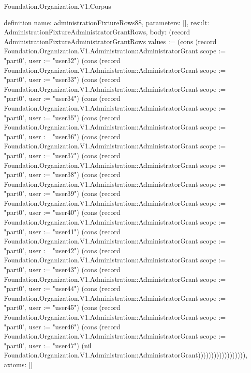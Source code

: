 \begin{lexlean}{Foundation.Organization.V1.Corpus}
\begin{semanticmodule}
definition{
  name: administrationFixtureRows88,
  parameters: [],
  result: AdministrationFixtureAdministratorGrantRows,
  body: (record AdministrationFixtureAdministratorGrantRows {values := (cons (record Foundation.Organization.V1.Administration::AdministratorGrant {scope := "part0", user := "user32"}) (cons (record Foundation.Organization.V1.Administration::AdministratorGrant {scope := "part0", user := "user33"}) (cons (record Foundation.Organization.V1.Administration::AdministratorGrant {scope := "part0", user := "user34"}) (cons (record Foundation.Organization.V1.Administration::AdministratorGrant {scope := "part0", user := "user35"}) (cons (record Foundation.Organization.V1.Administration::AdministratorGrant {scope := "part0", user := "user36"}) (cons (record Foundation.Organization.V1.Administration::AdministratorGrant {scope := "part0", user := "user37"}) (cons (record Foundation.Organization.V1.Administration::AdministratorGrant {scope := "part0", user := "user38"}) (cons (record Foundation.Organization.V1.Administration::AdministratorGrant {scope := "part0", user := "user39"}) (cons (record Foundation.Organization.V1.Administration::AdministratorGrant {scope := "part0", user := "user40"}) (cons (record Foundation.Organization.V1.Administration::AdministratorGrant {scope := "part0", user := "user41"}) (cons (record Foundation.Organization.V1.Administration::AdministratorGrant {scope := "part0", user := "user42"}) (cons (record Foundation.Organization.V1.Administration::AdministratorGrant {scope := "part0", user := "user43"}) (cons (record Foundation.Organization.V1.Administration::AdministratorGrant {scope := "part0", user := "user44"}) (cons (record Foundation.Organization.V1.Administration::AdministratorGrant {scope := "part0", user := "user45"}) (cons (record Foundation.Organization.V1.Administration::AdministratorGrant {scope := "part0", user := "user46"}) (cons (record Foundation.Organization.V1.Administration::AdministratorGrant {scope := "part0", user := "user47"}) (nil Foundation.Organization.V1.Administration::AdministratorGrant)))))))))))))))))}),
  axioms: []
}


\end{semanticmodule}
\end{lexlean}
